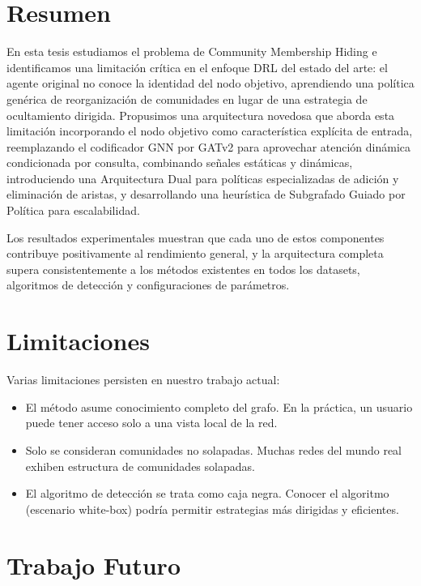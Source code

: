 \documentclass[11pt,a4paper,twoside]{tesis}
\begin{document}
\section{Resumen}
\label{sec:resumen}

En esta tesis estudiamos el problema de Community Membership Hiding e identificamos una
limitación crítica en el enfoque DRL del estado del arte: el agente original no conoce
la identidad del nodo objetivo, aprendiendo una política genérica de reorganización de
comunidades en lugar de una estrategia de ocultamiento dirigida. Propusimos una
arquitectura novedosa que aborda esta limitación incorporando el nodo objetivo como
característica explícita de entrada, reemplazando el codificador GNN por GATv2 para
aprovechar atención dinámica condicionada por consulta, combinando señales estáticas y
dinámicas, introduciendo una Arquitectura Dual para políticas especializadas de adición
y eliminación de aristas, y desarrollando una heurística de Subgrafado Guiado por
Política para escalabilidad.

Los resultados experimentales muestran que cada uno de estos componentes contribuye
positivamente al rendimiento general, y la arquitectura completa supera consistentemente
a los métodos existentes en todos los datasets, algoritmos de detección y configuraciones
de parámetros.

\section{Limitaciones}
\label{sec:limitaciones}

Varias limitaciones persisten en nuestro trabajo actual:
\begin{itemize}
    \item El método asume conocimiento completo del grafo. En la práctica, un usuario
          puede tener acceso solo a una vista local de la red.
    \item Solo se consideran comunidades no solapadas. Muchas redes del mundo real
          exhiben estructura de comunidades solapadas.
    \item El algoritmo de detección se trata como caja negra. Conocer el algoritmo
          (escenario white-box) podría permitir estrategias más dirigidas y eficientes.
\end{itemize}

\section{Trabajo Futuro}
\label{sec:futuro}
\end{document}
